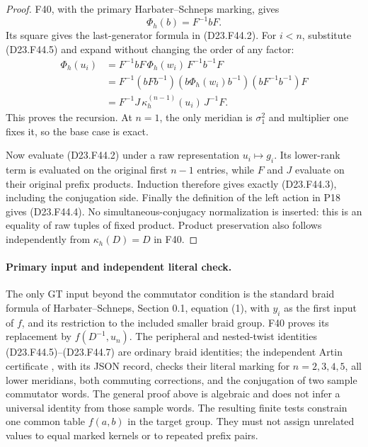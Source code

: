 \begin{proof}
F40, with the primary Harbater--Schneps marking, gives
\[
                       \Phi_h(b)=F^{-1}bF.
\]
Its square gives the last-generator formula in
(D23.F44.2). For $i<n$, substitute (D23.F44.5) and expand
without changing the order of any factor:
\[
\begin{split}
 \Phi_h(u_i)
 &=F^{-1}bF\,\Phi_h(w_i)\,F^{-1}b^{-1}F\\
 &=F^{-1}(bFb^{-1})
       (b\Phi_h(w_i)b^{-1})(bF^{-1}b^{-1})F\\
 &=F^{-1}J\,\kappa_h^{(n-1)}(u_i)\,J^{-1}F.
\end{split}
                                                        \tag{D23.F44.9}
\]
This proves the recursion. At $n=1$, the only meridian is
$\sigma_1^2$ and multiplier one fixes it, so the base case
is exact.

Now evaluate (D23.F44.2) under a raw representation
$u_i\mapsto g_i$. Its lower-rank term is evaluated on the
original first $n-1$ entries, while $F$ and $J$ evaluate
on their original prefix products. Induction therefore
gives exactly (D23.F44.3), including the conjugation side.
Finally the definition of the left action in P18 gives
(D23.F44.4). No simultaneous-conjugacy normalization is
inserted: this is an equality of raw tuples of fixed
product. Product preservation also follows independently
from $\kappa_h(D)=D$ in F40.
\end{proof}

\paragraph{Primary input and independent literal check.}
The only GT input beyond the commutator condition is the
standard braid formula of Harbater--Schneps, Section 0.1,
equation (1), with $y_i$ as the first input of $f$, and
its restriction to the included smaller braid group.
F40 proves its replacement by $f(D^{-1},u_n)$.
The peripheral and nested-twist identities
(D23.F44.5)--(D23.F44.7) are ordinary braid identities;
the independent Artin certificate
,
with its JSON record, checks their literal marking for
$n=2,3,4,5$, all lower meridians, both commuting corrections,
and the conjugation of two sample commutator words. The
general proof above is algebraic and does not infer a
universal identity from those sample words.
The resulting finite tests constrain one common table
$f(a,b)$ in the target group. They must not assign
unrelated values to equal marked kernels or to repeated
prefix pairs.

